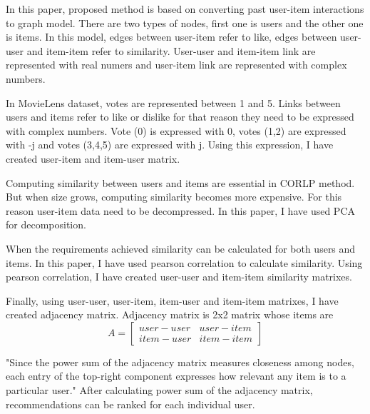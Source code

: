 In this paper, proposed method is based on converting past user-item interactions to graph model. There are two types of nodes, first one is users and the other one is items. In this model, edges between user-item refer to like, edges between user-user and item-item refer to similarity. User-user and item-item link are represented with real numers and user-item link are represented with complex numbers.\cite{xie2015link}

In MovieLens dataset, votes are represented between 1 and 5. Links between users and items refer to like or dislike for that reason they need to be expressed with complex numbers. Vote  (0) is expressed with 0, votes (1,2) are expressed with -j and votes (3,4,5) are expressed with j.\cite{xie2015link} Using this expression, I have created user-item and item-user matrix.

Computing similarity between users and items are essential in \ac{CORLP} method. But when size grows, computing similarity becomes more expensive. For this reason user-item data need to be decompressed. In this paper, I have used \ac{PCA} for decomposition.

When the requirements achieved similarity can be calculated for both users and items. In this paper, I have used pearson correlation to calculate similarity. Using pearson correlation, I have created user-user and item-item similarity matrixes.

Finally, using user-user, user-item, item-user and item-item matrixes, I have created adjacency matrix. Adjacency matrix is 2x2 matrix whose items are
\[
A=
  \begin{bmatrix}
    user-user & user-item \\
    item-user & item-item
  \end{bmatrix}
\]

"Since the power sum of the adjacency matrix measures closeness among nodes, each entry of the top-right component expresses how relevant any item is to a particular user."\cite{xie2015link} After calculating power sum of the adjacency matrix, recommendations can be ranked for each individual user.